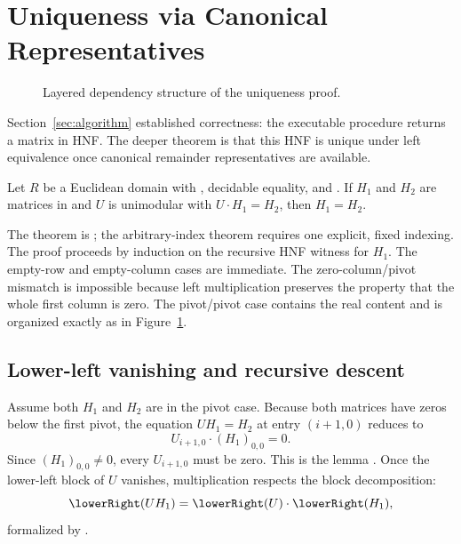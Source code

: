 \section{Uniqueness via Canonical Representatives}
\label{sec:uniqueness}

\begin{figure}[t]
  \centering
  
  \caption{Layered dependency structure of the uniqueness proof.}
  \label{fig:uniqueness-graph}
\end{figure}

Section~\ref{sec:algorithm} established correctness: the executable procedure returns a
matrix in HNF. The deeper theorem is that this HNF is unique under left
equivalence once canonical remainder representatives are available.

\begin{theorem}
Let \(R\) be a Euclidean domain with ,
decidable equality, and . If \(H_1\) and \(H_2\) are matrices
in  and \(U\) is unimodular with
\(U \cdot H_1 = H_2\), then \(H_1 = H_2\).
\end{theorem}

The  theorem is
; the arbitrary-index theorem
 requires one explicit,
fixed indexing.
The proof proceeds by induction on the recursive HNF witness for \(H_1\). The
empty-row and empty-column cases are immediate. The zero-column/pivot mismatch is
impossible because left multiplication preserves the property that the whole
first column is zero. The pivot/pivot case contains the real content and is
organized exactly as in Figure~\ref{fig:uniqueness-graph}.

\subsection{Lower-left vanishing and recursive descent}

Assume both \(H_1\) and \(H_2\) are in the pivot case. Because both matrices have
zeros below the first pivot, the equation \(U H_1 = H_2\) at entry \((i+1,0)\)
reduces to
\[
  U_{i+1,0} \cdot (H_1)_{0,0} = 0.
\]
Since \((H_1)_{0,0} \neq 0\), every \(U_{i+1,0}\) must be zero. This is the
lemma . Once the lower-left block of
\(U\) vanishes, multiplication respects the block decomposition:
\[
  \lowerRight(U H_1) = \lowerRight(U) \cdot \lowerRight(H_1),
\]
formalized by .

